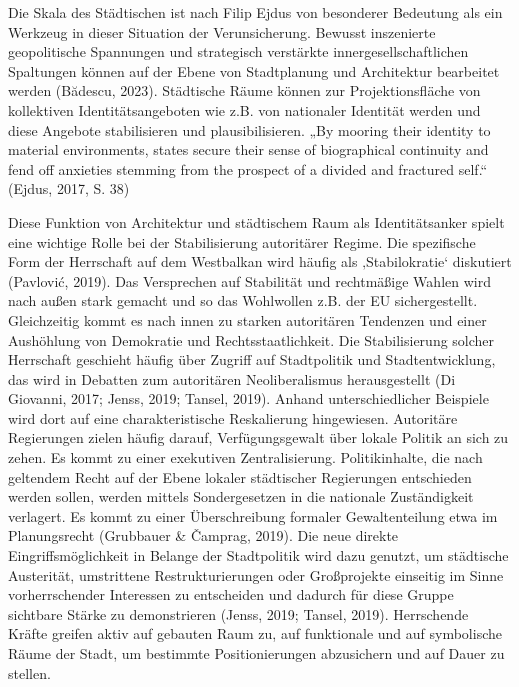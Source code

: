 \documentclass[
  ngerman,
]{agujournal2019}
\begin{document}
Die Skala des Städtischen ist nach Filip Ejdus von besonderer Bedeutung
als ein Werkzeug in dieser Situation der Verunsicherung. Bewusst
inszenierte geopolitische Spannungen und strategisch verstärkte
innergesellschaftlichen Spaltungen können auf der Ebene von Stadtplanung
und Architektur bearbeitet werden (Bădescu, 2023). Städtische Räume
können zur Projektionsfläche von kollektiven Identitätsangeboten wie
z.B. von nationaler Identität werden und diese Angebote stabilisieren
und plausibilisieren. „By mooring their identity to material
environments, states secure their sense of biographical continuity and
fend off anxieties stemming from the prospect of a divided and fractured
self.`` (Ejdus, 2017, S. 38)

Diese Funktion von Architektur und städtischem Raum als Identitätsanker
spielt eine wichtige Rolle bei der Stabilisierung autoritärer Regime.
Die spezifische Form der Herrschaft auf dem Westbalkan wird häufig als
‚Stabilokratie` diskutiert (Pavlović, 2019). Das Versprechen auf
Stabilität und rechtmäßige Wahlen wird nach außen stark gemacht und so
das Wohlwollen z.B. der EU sichergestellt. Gleichzeitig kommt es nach
innen zu starken autoritären Tendenzen und einer Aushöhlung von
Demokratie und Rechtsstaatlichkeit. Die Stabilisierung solcher
Herrschaft geschieht häufig über Zugriff auf Stadtpolitik und
Stadtentwicklung, das wird in Debatten zum autoritären Neoliberalismus
herausgestellt (Di Giovanni, 2017; Jenss, 2019; Tansel, 2019). Anhand
unterschiedlicher Beispiele wird dort auf eine charakteristische
Reskalierung hingewiesen. Autoritäre Regierungen zielen häufig darauf,
Verfügungsgewalt über lokale Politik an sich zu zehen. Es kommt zu einer
exekutiven Zentralisierung. Politikinhalte, die nach geltendem Recht auf
der Ebene lokaler städtischer Regierungen entschieden werden sollen,
werden mittels Sondergesetzen in die nationale Zuständigkeit verlagert.
Es kommt zu einer Überschreibung formaler Gewaltenteilung etwa im
Planungsrecht (Grubbauer \& Čamprag, 2019). Die neue direkte
Eingriffsmöglichkeit in Belange der Stadtpolitik wird dazu genutzt, um
städtische Austerität, umstrittene Restrukturierungen oder Großprojekte
einseitig im Sinne vorherrschender Interessen zu entscheiden und dadurch
für diese Gruppe sichtbare Stärke zu demonstrieren (Jenss, 2019; Tansel,
2019). Herrschende Kräfte greifen aktiv auf gebauten Raum zu, auf
funktionale und auf symbolische Räume der Stadt, um bestimmte
Positionierungen abzusichern und auf Dauer zu stellen.
\end{document}
